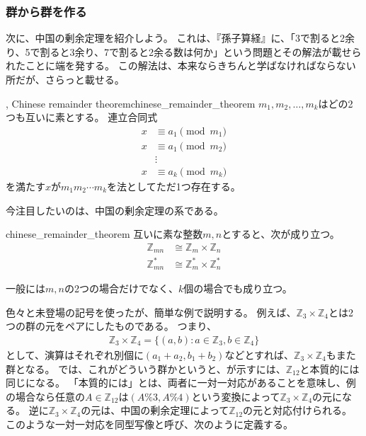 \subsubsection{群から群を作る}
次に、中国の剰余定理を紹介しよう。
これは、『孫子算経』に、「3で割ると2余り、5で割ると3余り、7で割ると2余る数は何か」という問題とその解法が載せられたことに端を発する。
この解法は、本来ならきちんと学ばなければならない所だが、さらっと載せる。

\begin{Theo}{, Chinese remainder theorem}{chinese_remainder_theorem}
$m_1,m_2,\ldots,m_k$はどの2つも互いに素とする。
連立合同式
\begin{align*}
x &\equiv a_1 \pmod{m_1}\\
x &\equiv a_1 \pmod{m_2}\\
&\vdots\\
x &\equiv a_k \pmod{m_k}
\end{align*}
を満たす$x$が$m_1m_2\cdots m_k$を法としてただ1つ存在する。
\end{Theo}


今注目したいのは、中国の剰余定理の系である。

\begin{Coro}{}{chinese_remainder_theorem}
互いに素な整数$m,n$とすると、次が成り立つ。
\begin{align*}
\mathbb{Z}_{mn} &\cong \mathbb{Z}_m \times \mathbb{Z}_n\\
\mathbb{Z}_{mn}^* &\cong \mathbb{Z}_m^* \times \mathbb{Z}_n^*
\end{align*}
\end{Coro}

一般には$m,n$の2つの場合だけでなく、$k$個の場合でも成り立つ。

色々と未登場の記号を使ったが、簡単な例で説明する。
例えば、$\mathbb{Z}_3\times\mathbb{Z}_4$とは2つの群の元をペアにしたものである。
つまり、
\begin{align*}
\mathbb{Z}_3\times\mathbb{Z}_4 = \{(a,b) : a \in \mathbb{Z}_3, b \in \mathbb{Z}_4\}
\end{align*}
として、演算はそれぞれ別個に$(a_1+a_2,b_1+b_2)$などとすれば、$\mathbb{Z}_3\times\mathbb{Z}_4$もまた群となる。
では、これがどういう群かというと、が示すには、$\mathbb{Z}_{12}$と本質的には同じになる。
「本質的には」とは、両者に一対一対応があることを意味し、例の場合なら任意の$A\in\mathbb{Z}_{12}$は$(A \% 3, A \% 4)$という変換によって$\mathbb{Z}_3\times\mathbb{Z}_4$の元になる。
逆に$\mathbb{Z}_3\times\mathbb{Z}_4$の元は、中国の剰余定理によって$\mathbb{Z}_{12}$の元と対応付けられる。
このような一対一対応を同型写像と呼び、次のように定義する。

